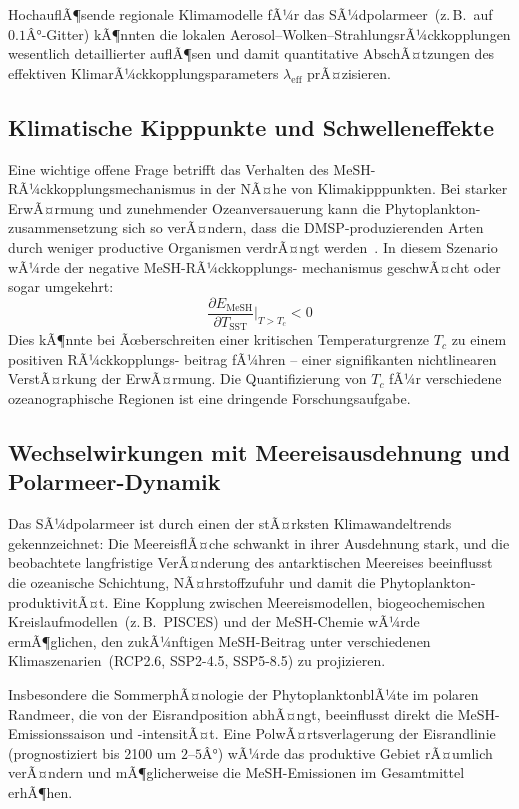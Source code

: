 ﻿\documentclass[a4paper,12pt]{article}
\theoremstyle{definition}
\begin{document}
HochauflÃ¶sende regionale Klimamodelle fÃ¼r das SÃ¼dpolarmeer~(z.\,B.\ auf $0.1Â°$-Gitter) kÃ¶nnten
die lokalen Aerosol--Wolken--StrahlungsrÃ¼ckkopplungen wesentlich detaillierter auflÃ¶sen und
damit quantitative AbschÃ¤tzungen des effektiven KlimarÃ¼ckkopplungsparameters $\lambda_{\mathrm{eff}}$
prÃ¤zisieren.

\subsection{Klimatische Kipppunkte und Schwelleneffekte}

Eine wichtige offene Frage betrifft das Verhalten des MeSH-RÃ¼ckkopplungsmechanismus in der NÃ¤he
von Klimakipppunkten. Bei starker ErwÃ¤rmung und zunehmender Ozeanversauerung kann die Phytoplankton-
zusammensetzung sich so verÃ¤ndern, dass die DMSP-produzierenden Arten durch weniger productive
Organismen verdrÃ¤ngt werden~\cite{bopp2001}. In diesem Szenario wÃ¼rde der negative MeSH-RÃ¼ckkopplungs-
mechanismus geschwÃ¤cht oder sogar umgekehrt:
\[
  \frac{\partial E_{\mathrm{MeSH}}}{\partial T_{\mathrm{SST}}}\bigg|_{T > T_c} < 0
\]
Dies kÃ¶nnte bei Ãœberschreiten einer kritischen Temperaturgrenze $T_c$ zu einem positiven RÃ¼ckkopplungs-
beitrag fÃ¼hren -- einer signifikanten nichtlinearen VerstÃ¤rkung der ErwÃ¤rmung. Die Quantifizierung
von $T_c$ fÃ¼r verschiedene ozeanographische Regionen ist eine dringende Forschungsaufgabe.

\subsection{Wechselwirkungen mit Meereisausdehnung und Polarmeer-Dynamik}

Das SÃ¼dpolarmeer ist durch einen der stÃ¤rksten Klimawandeltrends gekennzeichnet: Die MeereisflÃ¤che
schwankt in ihrer Ausdehnung stark, und die beobachtete langfristige VerÃ¤nderung des antarktischen
Meereises beeinflusst die ozeanische Schichtung, NÃ¤hrstoffzufuhr und damit die Phytoplankton-
produktivitÃ¤t. Eine Kopplung zwischen Meereismodellen, biogeochemischen Kreislaufmodellen~(z.\,B.\ PISCES)
und der MeSH-Chemie wÃ¼rde ermÃ¶glichen, den zukÃ¼nftigen MeSH-Beitrag unter verschiedenen
Klimaszenarien~(RCP2.6, SSP2-4.5, SSP5-8.5) zu projizieren.

Insbesondere die SommerphÃ¤nologie der PhytoplanktonblÃ¼te im polaren Randmeer, die von der
Eisrandposition abhÃ¤ngt, beeinflusst direkt die MeSH-Emissionssaison und -intensitÃ¤t. Eine
PolwÃ¤rtsverlagerung der Eisrandlinie (prognostiziert bis 2100 um $2$--$5Â°$) wÃ¼rde das produktive
Gebiet rÃ¤umlich verÃ¤ndern und mÃ¶glicherweise die MeSH-Emissionen im Gesamtmittel erhÃ¶hen.
\end{document}
